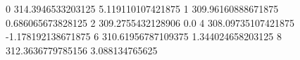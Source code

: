 0 314.3946533203125 5.119110107421875
1 309.96160888671875 0.686065673828125
2 309.2755432128906 0.0
4 308.09735107421875 -1.178192138671875
6 310.61956787109375 1.344024658203125
8 312.3636779785156 3.088134765625
